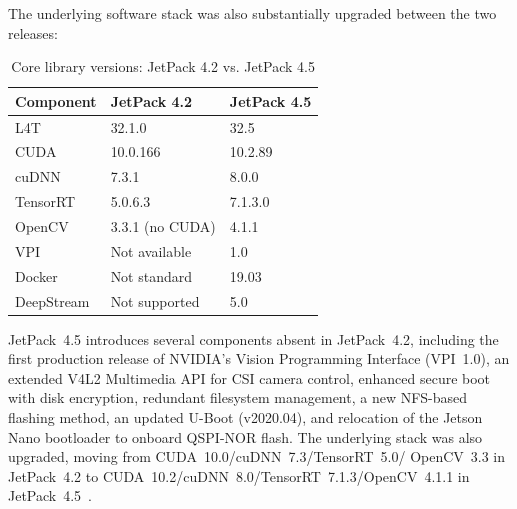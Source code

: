 The underlying software stack was also substantially upgraded between the two
releases:

\begin{table}[H]
	\centering
	\caption{Core library versions: JetPack 4.2 vs. JetPack 4.5}
	\label{tab:jetpack_comparison}
	\begin{tabular}{lll}
		\toprule
		\textbf{Component} & \textbf{JetPack 4.2} & \textbf{JetPack 4.5} \\
		\midrule
		L4T      & 32.1.0            & 32.5              \\
		CUDA     & 10.0.166          & 10.2.89           \\
		cuDNN    & 7.3.1             & 8.0.0             \\
		TensorRT & 5.0.6.3           & 7.1.3.0           \\
		OpenCV   & 3.3.1 (no CUDA)   & 4.1.1             \\
		VPI      & Not available     & 1.0               \\
		Docker   & Not standard      & 19.03             \\
		DeepStream & Not supported   & 5.0               \\
		\bottomrule
	\end{tabular}
\end{table}

JetPack~4.5 introduces several components absent in JetPack~4.2, including the first
production release of NVIDIA's Vision Programming Interface (VPI~1.0), an extended
V4L2 Multimedia API for CSI camera control, enhanced secure boot with disk encryption,
redundant filesystem management, a new NFS-based flashing method, an updated U-Boot
(v2020.04), and relocation of the Jetson Nano bootloader to onboard QSPI-NOR flash.
The underlying stack was also upgraded, moving from CUDA~10.0/cuDNN~7.3/TensorRT~5.0/
OpenCV~3.3 in JetPack~4.2 to CUDA~10.2/cuDNN~8.0/TensorRT~7.1.3/OpenCV~4.1.1 in
JetPack~4.5~\cite{JetPackOS:2021}.



